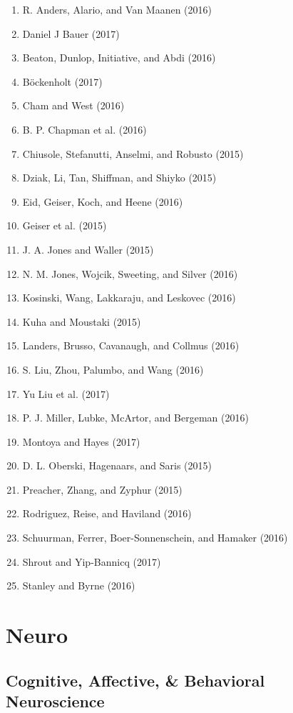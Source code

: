 \documentclass[english,man]{apa6}
\providecommand{\tightlist}{%
  \setlength{\itemsep}{0pt}\setlength{\parskip}{0pt}}
\theoremstyle{definition}
\theoremstyle{definition}
\theoremstyle{definition}
\theoremstyle{remark}
\begin{document}
\begin{enumerate}
\def\labelenumi{\arabic{enumi})}
\tightlist
\item
  R. Anders, Alario, and Van Maanen (2016)
\item
  Daniel J Bauer (2017)
\item
  Beaton, Dunlop, Initiative, and Abdi (2016)
\item
  Böckenholt (2017)
\item
  Cham and West (2016)
\item
  B. P. Chapman et al. (2016)
\item
  Chiusole, Stefanutti, Anselmi, and Robusto (2015)
\item
  Dziak, Li, Tan, Shiffman, and Shiyko (2015)
\item
  Eid, Geiser, Koch, and Heene (2016)
\item
  Geiser et al. (2015)
\item
  J. A. Jones and Waller (2015)
\item
  N. M. Jones, Wojcik, Sweeting, and Silver (2016)
\item
  Kosinski, Wang, Lakkaraju, and Leskovec (2016)
\item
  Kuha and Moustaki (2015)
\item
  Landers, Brusso, Cavanaugh, and Collmus (2016)
\item
  S. Liu, Zhou, Palumbo, and Wang (2016)
\item
  Yu Liu et al. (2017)
\item
  P. J. Miller, Lubke, McArtor, and Bergeman (2016)
\item
  Montoya and Hayes (2017)
\item
  D. L. Oberski, Hagenaars, and Saris (2015)
\item
  Preacher, Zhang, and Zyphur (2015)
\item
  Rodriguez, Reise, and Haviland (2016)
\item
  Schuurman, Ferrer, Boer-Sonnenschein, and Hamaker (2016)
\item
  Shrout and Yip-Bannicq (2017)
\item
  Stanley and Byrne (2016)
\end{enumerate}

\section{Neuro}\label{neuro}

\subsection{Cognitive, Affective, \& Behavioral
Neuroscience}\label{cognitive-affective-behavioral-neuroscience}
\end{document}
